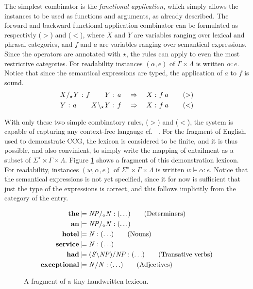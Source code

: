 The simplest combinator is the \emph{functional application}, which simply allows the instances to be used as functions and arguments, as already described. The forward and backward functional application combinator can be formulated as respectivly ($>$) and ($<$), where $X$ and $Y$ are variables ranging over lexical and phrasal categories, and $f$ and $a$ are variables ranging over semantical expressions. Since the operators are annotated with $\star$, the rules can apply to even the most restrictive categories. For readability instances $(\alpha, e)$ of $\Gamma \times \Lambda$ is written $\alpha : e$. Notice that since the semantical expressions are typed, the application of $a$ to $f$ is sound. 
\begin{align*}
  \catvar{X}/_\star \catvar{Y} : \fvar{f}  \quad\quad                  \catvar{Y} : \fvar{a} 
  &\quad\Rightarrow\quad
  \catvar{X} : \fvar{f} \fvar{a} 
  \tag{$>$} \\
  \catvar{Y}            : \fvar{a}  \quad\quad  \catvar{X} \bsl_\star \catvar{Y} : \fvar{f}
  &\quad\Rightarrow\quad
  \catvar{X} : \fvar{f} \fvar{a}
  \tag{$<$}
\end{align*}

With only these two simple combinatory rules, ($>$) and ($<$), the system is capable of capturing any context-free langauge cf.\ \citeauthor{sp} . For the fragment of English, used to demonstrate CCG, the lexicon is considered to be finite, and it is thus possible, and also convinient, to simply write the mapping of entailment as a subset of $\Sigma^\star \times \Gamma \times \Lambda$. Figure \ref{fig:TinyLex} shows a fragment of this demonstration lexicon. For readability, instances $(w, \alpha, e)$ of $\Sigma^\star \times \Gamma \times \Lambda$ is written $w \models \alpha : e$. Notice that the semantical expressions is not yet specified, since it for now is sufficient that just the type of the expressions is correct, and this follows implicitly from the category of the entry.
\begin{figure}[ht]
\vspace{-.5em}
\begin{align*}
  \mathbf{the}       &\models {\mathit{NP}} /_\diamond {\mathit{N}}    : (\ldots)    \tag{Determiners} \\
  \mathbf{an}        &\models {\mathit{NP}} /_\diamond {\mathit{N}}    : (\ldots)    \\
  \mathbf{hotel}     &\models {\mathit{N}}               : (\ldots)                 \tag{Nouns} \\
  \mathbf{service}   &\models {\mathit{N}}               : (\ldots)                 \\
  \mathbf{had}       &\models ({\mathit{S}} \backslash {\mathit{NP}})/{\mathit{NP}}
                                                  : (\ldots)               \tag{Transative verbs} \\
  \mathbf{exceptional}   &\models {\mathit{N/N}}         : (\ldots)                 \tag{Adjectives}  
\end{align*}
\vspace{-1em}
\caption{A fragment of a tiny handwritten lexicon.}
\label{fig:TinyLex}
\end{figure}

